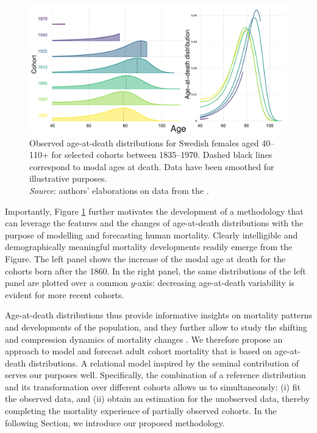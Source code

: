 \documentclass[11pt, a4paper]{article}
\begin{document}
{\begin{figure}[t]
	\begin{center}
		\includegraphics[scale=0.60]{./Figures/F1.pdf}
		\caption{{\color{red}Observed age-at-death distributions for Swedish females aged 40--110+ for selected cohorts between 1835--1970. Dashed black lines correspond to modal ages at death. Data have been smoothed for illustrative purposes. \\ \small \textit{Source}: authors' elaborations on data from the \cite{HMD}.}}\label{Fig:ADDcohort}	
	\end{center}
\end{figure}

Importantly, Figure \ref{Fig:ADDcohort} further motivates the development of a methodology that can leverage the features and the changes of age-at-death distributions with the purpose of modelling and forecasting human mortality. Clearly intelligible and demographically meaningful mortality developments readily emerge from the Figure. The left panel shows the increase of the modal age at death for the cohorts born after the 1860. In the right panel, the same distributions of the left panel are plotted over a common $y$-axis: decreasing age-at-death variability is evident for more recent cohorts.

Age-at-death distributions thus provide informative insights on mortality patterns and developments of the population, and they further allow to study the shifting and compression dynamics of mortality changes \cite[see, e.g.,][]{fries1980aging,kannisto2001mode,bongaarts2005long,janssen2019timing}. We therefore propose an approach to model and forecast adult cohort mortality that is based on age-at-death distributions. A relational model inspired by the seminal contribution of \cite{brass1971scale} serves our purposes well. Specifically, the combination of a reference distribution and its transformation over different cohorts allows us to simultaneously: (i) fit the observed data, and (ii) obtain an estimation for the unobserved data, thereby completing the mortality experience of partially observed cohorts. In the following Section, we introduce our proposed methodology.  

}
\end{document}
